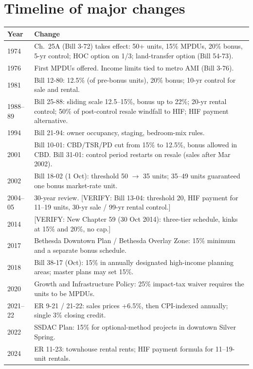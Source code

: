 \documentclass[11pt]{article}
\newcommand{\verify}[1]{\textcolor{red!70!black}{[VERIFY: #1]}}
\begin{document}
\section{Timeline of major changes}
\small
\begin{tabularx}{\linewidth}{@{}lX@{}}
\toprule
Year & Change \\
\midrule
1974 & Ch.\ 25A (Bill 3-72) takes effect: 50+ units, 15\% MPDUs, 20\% bonus, 5-yr control; HOC option on 1/3; land-transfer option (Bill 54-73). \\
1976 & First MPDUs offered. Income limits tied to metro AMI (Bill 3-76). \\
1981 & Bill 12-80: 12.5\% (of pre-bonus units), 20\% bonus; 10-yr control for sale and rental. \\
1988--89 & Bill 25-88: sliding scale 12.5--15\%, bonus up to 22\%; 20-yr rental control; 50\% of post-control resale windfall to HIF; HIF payment alternative. \\
1994 & Bill 21-94: owner occupancy, staging, bedroom-mix rules. \\
2001 & Bill 10-01: CBD/TSR/PD cut from 15\% to 12.5\%, bonus allowed in CBD. Bill 31-01: control period restarts on resale (sales after Mar 2002). \\
2002 & Bill 18-02 (1 Oct): threshold 50 $\to$ 35 units; 35--49 units guaranteed one bonus market-rate unit. \\
2004--05 & 30-year review. \verify{Bill 13-04: threshold 20, HIF payment for 11--19 units, 30-yr sale / 99-yr rental control.} \\
2014 & \verify{New Chapter 59 (30 Oct 2014): three-tier schedule, kinks at 15\% and 20\%, no cap.} \\
2017 & Bethesda Downtown Plan / Bethesda Overlay Zone: 15\% minimum and a separate bonus schedule. \\
2018 & Bill 38-17 (Oct): 15\% in annually designated high-income planning areas; master plans may set 15\%. \\
2020 & Growth and Infrastructure Policy: 25\% impact-tax waiver requires the units to be MPDUs. \\
2021--22 & ER 9-21 / 21-22: sales prices +6.5\%, then CPI-indexed annually; single 3\% closing credit. \\
2022 & SSDAC Plan: 15\% for optional-method projects in downtown Silver Spring. \\
2024 & ER 11-23: townhouse rental rents; HIF payment formula for 11--19-unit rentals. \\
\bottomrule
\end{tabularx}
\normalsize
\end{document}
